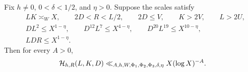 \begin{theorem}
\label{thm:factorable-exterior-wedge}
Fix $h\ne0$, $0<\delta<1/2$, and $\eta>0$.  Suppose the scales satisfy
\begin{align}
 &LK\asymp_WX,
 \qquad 2D<R<L/2,
 \qquad 2D\le V,
 \qquad K>2V,
 \qquad L>2U,
 \label{eq:wedge-geometric-conditions}\\
 &DL^2\le X^{1-\eta},
 \qquad D^{12}L^7\le X^{4-\eta},
 \qquad D^{20}L^{19}\le X^{10-\eta},
 \label{eq:wedge-Maynard-conditions}\\
 &LDR\le X^{1-\eta}.
 \label{eq:wedge-leakage-condition}
\end{align}
Then for every $A>0$,
\begin{equation}
 \mathcal H_{h,R}(L,K,D)
 \ll_{A,h,W,\Phi_1,\Phi_2,\Phi_3,\delta,\eta}
 X(\log X)^{-A}.
 \label{eq:factorable-wedge-bound}
\end{equation}
\end{theorem}

